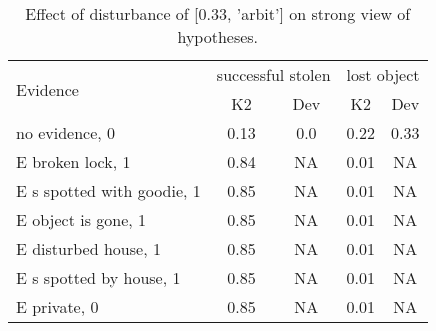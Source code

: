 \begin{table}\begin{tabular}{l|cc|cc}\toprule\multirow{2}{*}{Evidence} & \multicolumn{2}{c}{successful stolen}& \multicolumn{2}{c}{lost object}\\& {K2} & {Dev}& {K2} & {Dev}\\\midrule
no evidence, 0 & \cellcolor{Bittersweet}0.13&\cellcolor{Bittersweet}0.0&\cellcolor{Bittersweet}0.22&\cellcolor{Bittersweet}0.33\\E broken lock, 1 & \cellcolor{Bittersweet}0.84&\cellcolor{Bittersweet}NA&\cellcolor{Bittersweet}0.01&\cellcolor{Bittersweet}NA\\E s spotted with goodie, 1 & \cellcolor{Bittersweet}0.85&\cellcolor{Bittersweet}NA&\cellcolor{Bittersweet}0.01&\cellcolor{Bittersweet}NA\\E object is gone, 1 & \cellcolor{Bittersweet}0.85&\cellcolor{Bittersweet}NA&\cellcolor{Bittersweet}0.01&\cellcolor{Bittersweet}NA\\E disturbed house, 1 & \cellcolor{Bittersweet}0.85&\cellcolor{Bittersweet}NA&\cellcolor{Bittersweet}0.01&\cellcolor{Bittersweet}NA\\E s spotted by house, 1 & \cellcolor{Bittersweet}0.85&\cellcolor{Bittersweet}NA&\cellcolor{Bittersweet}0.01&\cellcolor{Bittersweet}NA\\E private, 0 & \cellcolor{Bittersweet}0.85&\cellcolor{Bittersweet}NA&\cellcolor{Bittersweet}0.01&\cellcolor{Bittersweet}NA\\\bottomrule\end{tabular}\caption{Effect of disturbance of [0.33, 'arbit'] on strong view of hypotheses.}\end{table}
